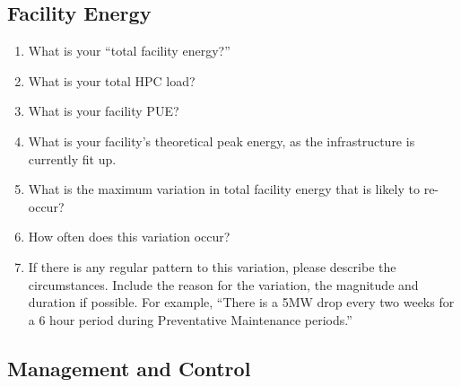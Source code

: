 \subsection*{Facility Energy}
\begin{enumerate}  %
\item
What is your ``total facility energy?''

\item
What is your total HPC load?

\item
What is your facility PUE?

\item
What is your facility's theoretical peak energy, as the infrastructure is currently fit up.

\item
What is the maximum variation in total facility energy that is likely to re-occur? 

\item
 How often does this variation occur?

\item
If there is any regular pattern to this variation, please describe the circumstances. 
Include the reason for the variation, the magnitude and duration if possible. 
For example, ``There is a 5MW drop every two weeks for a 6 hour period during Preventative 
Maintenance periods.''
\end{enumerate}

\subsection*{Management and Control}

